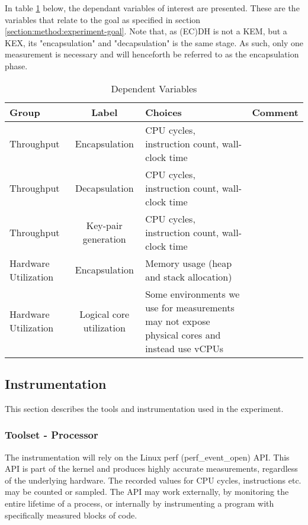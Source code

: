 In table \ref{table:method:experiment:dependent-variables} below, the dependant variables of interest are presented. These are the variables that relate to the goal as specified in section \ref{section:method:experiment-goal}. Note that, as (EC)DH is not a KEM, but a KEX, its "encapsulation" and "decapsulation" is the same stage. As such, only one measurement is necessary and will henceforth be referred to as the encapsulation phase.

\begin{table}[H]
    \centering
    \begin{tabular}{l|c|p{4cm}|p{3cm}}
        Group & Label & Choices & Comment \\
        \hline
        Throughput & Encapsulation & CPU cycles, instruction count, wall-clock time & \\
        Throughput & Decapsulation & CPU cycles, instruction count, wall-clock time & \\
        Throughput & Key-pair generation & CPU cycles, instruction count, wall-clock time & \\
        Hardware Utilization & Encapsulation & Memory usage (heap and stack allocation) & \\
        Hardware Utilization & Logical core utilization & Some environments we use for measurements may not expose physical cores and instead use vCPUs
    \end{tabular}
    \caption{Dependent Variables}
    \label{table:method:experiment:dependent-variables}
\end{table}

\subsection{Instrumentation}

This section describes the tools and instrumentation used in the experiment.

\subsubsection{Toolset - Processor}
The instrumentation will rely on the Linux perf (perf\_event\_open) API. This API is part of the kernel and produces highly accurate measurements, regardless of the underlying hardware. The recorded values for CPU cycles, instructions etc. may be counted or sampled. The API may work externally, by monitoring the entire lifetime of a process, or internally by instrumenting a program with specifically measured blocks of code.

